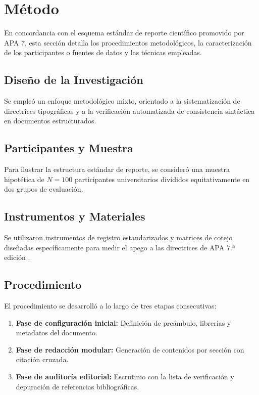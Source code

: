 \section{Método}

En concordancia con el esquema estándar de reporte científico promovido por APA 7, esta sección detalla los procedimientos metodológicos, la caracterización de los participantes o fuentes de datos y las técnicas empleadas.

\subsection{Diseño de la Investigación}
Se empleó un enfoque metodológico mixto, orientado a la sistematización de directrices tipográficas y a la verificación automatizada de consistencia sintáctica en documentos estructurados.

\subsection{Participantes y Muestra}
Para ilustrar la estructura estándar de reporte, se consideró una muestra hipotética de $N = 100$ participantes universitarios divididos equitativamente en dos grupos de evaluación.

\subsection{Instrumentos y Materiales}
Se utilizaron instrumentos de registro estandarizados y matrices de cotejo diseñadas específicamente para medir el apego a las directrices de APA 7.ª edición \parencite{apa2020}.

\subsection{Procedimiento}
El procedimiento se desarrolló a lo largo de tres etapas consecutivas:
\begin{enumerate}
    \item \textbf{Fase de configuración inicial:} Definición de preámbulo, librerías y metadatos del documento.
    \item \textbf{Fase de redacción modular:} Generación de contenidos por sección con citación cruzada.
    \item \textbf{Fase de auditoría editorial:} Escrutinio con la lista de verificación y depuración de referencias bibliográficas.
\end{enumerate}
